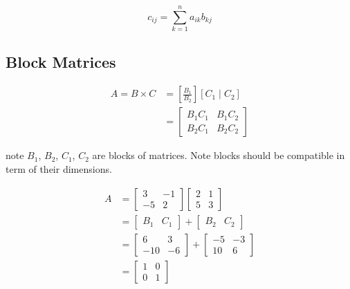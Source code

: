 \documentclass[main.tex]{subfiles}
\begin{document}
    $$
    c_{ij} = \sum_{k=1}^{n} a_{ik} b_{kj}
    $$

    \subsection{Block Matrices}
    
    $$
    \begin{aligned}
    A = B \times C  & = \left[\frac{B_{1}}{B_{2}}\right]\left[C_{1} \mid C_{2}\right]\\
                    & = \left[\begin{array} {l|l} B_{1} C_{1} & B_{1} C_{2} \\ \hline B_{2} C_{1} & B_{2} C_{2}\end{array}\right]
    \end{aligned}
    $$
    
    note $B_{1}$, $B_{2}$,  $C_1$, $C_{2}$ are blocks of matrices. Note blocks should be compatible in term of their dimensions.
    
    $$
    \begin{aligned}
    A & = \left[\begin{array}{l|l}
    3 & -1 \\ 
    -5 & 2
    \end{array}\right]\left[\begin{array}{ll}
    2 & 1 \\ \hline
    5 & 3
    \end{array}\right] \\
    & = \left[\begin{array}{ll}
    B_{1} & C_{1}
    \end{array}\right] + \left[\begin{array}{ll}
    B_{2} & C_{2}
    \end{array}\right] \\
    & =\left[\begin{array}{cc}
    6 & 3 \\
    -10 & -6
    \end{array}\right]+\left[\begin{array}{cc}
    -5 & -3 \\
    10 & 6
    \end{array}\right]\\
    & = \left[\begin{array}{ll}
    1 & 0 \\
    0 & 1
    \end{array}\right]
    \end{aligned}
    $$
    
\end{document}
